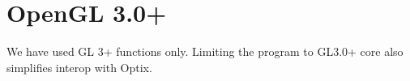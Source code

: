 \part{OpenGL 3.0+}

We have used GL 3+ functions only. Limiting the program to GL3.0+ core also simplifies interop with Optix.